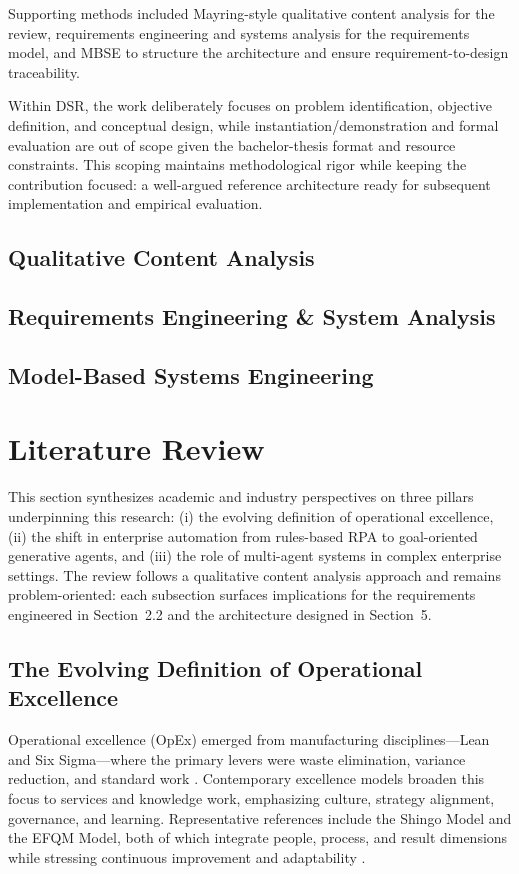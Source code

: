 Supporting methods included Mayring-style qualitative content analysis for the review, requirements engineering and systems analysis for the requirements model, and MBSE to structure the architecture and ensure requirement-to-design traceability.

Within DSR, the work deliberately focuses on problem identification, objective definition, and conceptual design, while instantiation/demonstration and formal evaluation are out of scope given the bachelor-thesis format and resource constraints. This scoping maintains methodological rigor while keeping the contribution focused: a well-argued reference architecture ready for subsequent implementation and empirical evaluation.

\subsection{Qualitative Content Analysis}\label{subsec:qca}

\subsection{Requirements Engineering \& System Analysis}\label{subsec:re\&sa}
\subsection{Model-Based Systems Engineering}\label{subsec:mbse}
\section{Literature Review}\label{sec:literature-review}

This section synthesizes academic and industry perspectives on three pillars underpinning this research: (i) the evolving definition of operational excellence, (ii) the shift in enterprise automation from rules-based RPA to goal-oriented generative agents, and (iii) the role of multi-agent systems in complex enterprise settings. The review follows a qualitative content analysis approach \parencite{mayringQualitativeContentAnalysis2022} and remains problem-oriented: each subsection surfaces implications for the requirements engineered in Section~2.2 and the architecture designed in Section~5.

\subsection{The Evolving Definition of Operational Excellence}
Operational excellence (OpEx) emerged from manufacturing disciplines—Lean and Six Sigma—where the primary levers were waste elimination, variance reduction, and standard work \parencite{Womack1990,Harry1998}. Contemporary excellence models broaden this focus to services and knowledge work, emphasizing culture, strategy alignment, governance, and learning. Representative references include the Shingo Model and the EFQM Model, both of which integrate people, process, and result dimensions while stressing continuous improvement and adaptability \parencite{Shingo2014,EFQM2020}.

